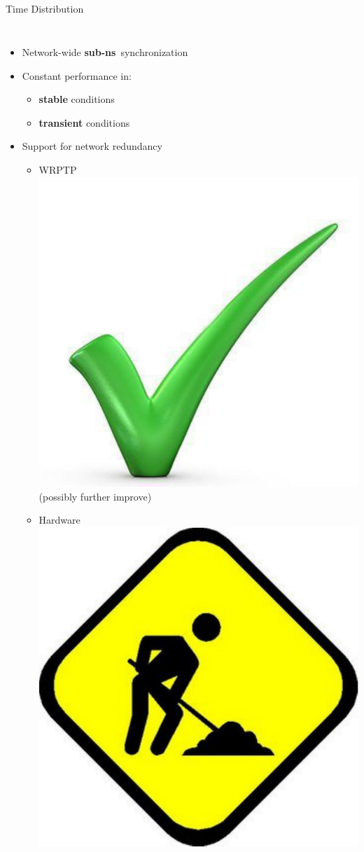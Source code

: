 \documentclass[compress,red]{beamer}
\begin{document}
\subsection{}
\begin{frame}{Time Distribution}

  \begin{columns}[c]

  \begin{itemize}
    \item Network-wide {\bf sub-ns}~synchronization
    \vspace{0.3cm}
    \item Constant performance in:
	\begin{itemize}
	  \item {\bf stable} conditions
	  \item {\bf transient} conditions
	\end{itemize}
    \vspace{0.3cm}
    \item Support for network redundancy
    \begin{itemize}
      \item WRPTP \includegraphics[width=.5cm]{misc/big-tick.pdf}  (possibly further improve)
      \item Hardware \includegraphics[width=.5cm]{misc/underconstruction.pdf}
    \end{itemize}
  \end{itemize}



\end{columns}
\end{frame}
\end{document}
